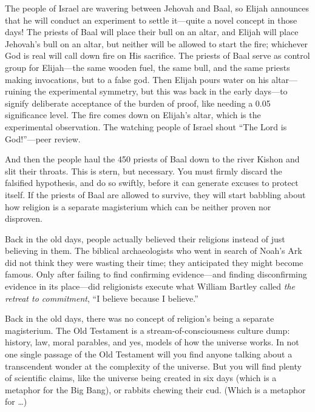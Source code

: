 {
 The people of Israel are wavering between Jehovah and Baal, so
Elijah announces that he will conduct an experiment to settle
it---quite a novel concept in those days! The priests of Baal will
place their bull on an altar, and Elijah will place
Jehovah's bull on an altar, but neither will be allowed
to start the fire; whichever God is real will call down fire on His
sacrifice. The priests of Baal serve as control group for Elijah---the
same wooden fuel, the same bull, and the same priests making
invocations, but to a false god. Then Elijah pours water on his
altar---ruining the experimental symmetry, but this was back in the
early days---to signify deliberate acceptance of the burden of proof,
like needing a 0.05 significance level. The fire comes down on
Elijah's altar, which is the experimental observation.
The watching people of Israel shout ``The Lord is
God!''---peer review.}

{
 And then the people haul the 450 priests of Baal down to the river
Kishon and slit their throats. This is stern, but necessary. You must
firmly discard the falsified hypothesis, and do so swiftly, before it
can generate excuses to protect itself. If the priests of Baal are
allowed to survive, they will start babbling about how religion is a
separate magisterium which can be neither proven nor disproven.}

{
 Back in the old days, people actually believed their religions
instead of just believing in them. The biblical archaeologists who went
in search of Noah's Ark did not think they were wasting
their time; they anticipated they might become famous. Only after
failing to find confirming evidence---and finding disconfirming
evidence in its place---did religionists execute what William Bartley
called \textit{the retreat to commitment}, ``I believe
because I believe.''}

{
 Back in the old days, there was no concept of
religion's being a separate magisterium. The Old
Testament is a stream-of-consciousness culture dump: history, law,
moral parables, and yes, models of how the universe works. In not one
single passage of the Old Testament will you find anyone talking about
a transcendent wonder at the complexity of the universe. But you will
find plenty of scientific claims, like the universe being created in
six days (which is a metaphor for the Big Bang), or rabbits chewing
their cud. (Which is a metaphor for \ldots)}

